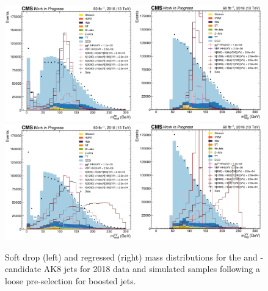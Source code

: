 \begin{figure}[htb!]
    \centering
    \includegraphics[width=0.49\textwidth]{figures/05-HH/jetmass/2018/bbFatJetMsd.pdf}
    \includegraphics[width=0.49\textwidth]{figures/05-HH/jetmass/2018/bbFatJetParticleNetMass.pdf}
    \includegraphics[width=0.49\textwidth]{figures/05-HH/jetmass/2018/VVFatJetMsd.pdf}
    \includegraphics[width=0.49\textwidth]{figures/05-HH/jetmass/2018/VVFatJetParticleNetMass.pdf}
    \caption{Soft drop (left) and regressed (right) mass distributions for the \bbbar and \VV-candidate AK8 jets for 2018 data and simulated samples following a loose pre-selection for boosted jets.}
    \label{fig:05_ak8jetmass_2018}
\end{figure}

